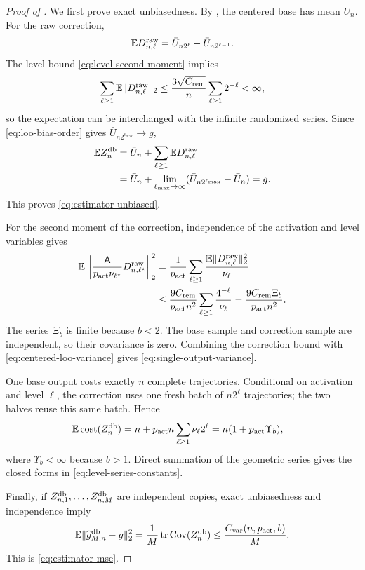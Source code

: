 \begin{proof}[Proof of ]
We first prove exact unbiasedness.  By , the centered base has mean $\bar U_n$.  For the raw correction,
\begin{equation}\label{eq:delta-mean}
 \mathbb E D_{n,\ell}^{\rm raw}
 =\bar U_{n2^\ell}-\bar U_{n2^{\ell-1}}.
\end{equation}
The level bound \eqref{eq:level-second-moment} implies
\[
 \sum_{\ell\ge1}\mathbb E\lVert D_{n,\ell}^{\rm raw}\rVert_2
 \le\frac{3\sqrt{C_{\rm rem}}}{n}\sum_{\ell\ge1}2^{-\ell}<\infty,
\]
so the expectation can be interchanged with the infinite randomized series.  Since \eqref{eq:loo-bias-order} gives $\bar U_{n2^{\ell_{\max}}}\to g$,
\begin{align*}
 \mathbb E Z_n^{\mathrm{db}}
 &=\bar U_n+\sum_{\ell\ge1}\mathbb E D_{n,\ell}^{\rm raw}\\
 &=\bar U_n+\lim_{\ell_{\max}\to\infty}(\bar U_{n2^{\ell_{\max}}}-\bar U_n)
 =g.
\end{align*}
This proves \eqref{eq:estimator-unbiased}.

For the second moment of the correction, independence of the activation and level variables gives
\begin{align*}
 \mathbb E\left\|\frac{\mathsf A}{p_{\rm act}\nu_{\ell^\star}}D_{n,\ell^\star}^{\rm raw}\right\|_2^2
 &=\frac{1}{p_{\rm act}}\sum_{\ell\ge1}
 \frac{\mathbb E\lVert D_{n,\ell}^{\rm raw}\rVert_2^2}{\nu_\ell}\\
 &\le\frac{9C_{\rm rem}}{p_{\rm act} n^2}
 \sum_{\ell\ge1}\frac{4^{-\ell}}{\nu_\ell}
 =\frac{9C_{\rm rem}\Xi_b}{p_{\rm act} n^2}.
\end{align*}
The series $\Xi_b$ is finite because $b<2$.  The base sample and correction sample are independent, so their covariance is zero.  Combining the correction bound with \eqref{eq:centered-loo-variance} gives \eqref{eq:single-output-variance}.

One base output costs exactly $n$ complete trajectories.  Conditional on activation and level $\ell$, the correction uses one fresh batch of $n2^\ell$ trajectories; the two halves reuse this same batch.  Hence
\begin{align*}
 \mathbb E\operatorname{cost}(Z_n^{\mathrm{db}})
 &=n+p_{\rm act} n\sum_{\ell\ge1}\nu_\ell2^\ell
 =n(1+p_{\rm act} \Upsilon_b),
\end{align*}
where $\Upsilon_b<\infty$ because $b>1$.  Direct summation of the geometric series gives the closed forms in \eqref{eq:level-series-constants}.

Finally, if $Z_{n,1}^{\mathrm{db}},\ldots,Z_{n,M}^{\mathrm{db}}$ are independent copies, exact unbiasedness and independence imply
\[
 \mathbb E\lVert\widehat g_{M,n}^{\mathrm{db}}-g\rVert_2^2
 =\frac1M\operatorname{tr}\operatorname{Cov}(Z_n^{\mathrm{db}})
 \le\frac{C_{\rm var}(n,p_{\rm act},b)}{M}.
\]
This is \eqref{eq:estimator-mse}.
\end{proof}

